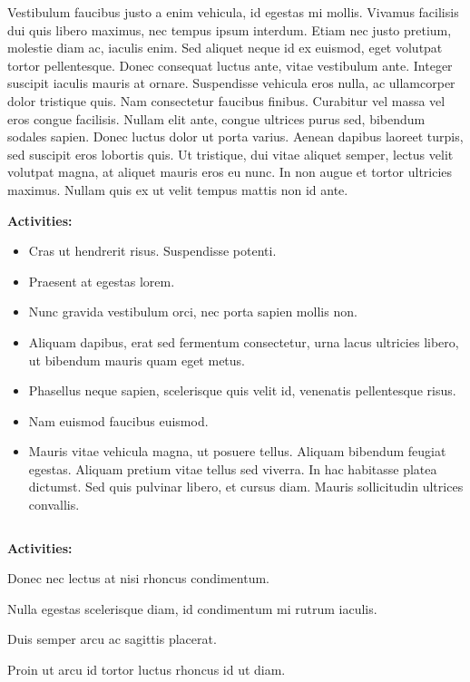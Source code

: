 \documentclass[
]{book}
\begin{document}
Vestibulum faucibus justo a enim vehicula, id egestas mi mollis. Vivamus facilisis dui quis libero maximus, nec tempus ipsum interdum. Etiam nec justo pretium, molestie diam ac, iaculis enim. Sed aliquet neque id ex euismod, eget volutpat tortor pellentesque. Donec consequat luctus ante, vitae vestibulum ante. Integer suscipit iaculis mauris at ornare. Suspendisse vehicula eros nulla, ac ullamcorper dolor tristique quis. Nam consectetur faucibus finibus. Curabitur vel massa vel eros congue facilisis. Nullam elit ante, congue ultrices purus sed, bibendum sodales sapien. Donec luctus dolor ut porta varius. Aenean dapibus laoreet turpis, sed suscipit eros lobortis quis. Ut tristique, dui vitae aliquet semper, lectus velit volutpat magna, at aliquet mauris eros eu nunc. In non augue et tortor ultricies maximus. Nullam quis ex ut velit tempus mattis non id ante.

\textbf{Activities:}

\begin{itemize}
\item
  Cras ut hendrerit risus. Suspendisse potenti.
\item
  Praesent at egestas lorem.
\item
  Nunc gravida vestibulum orci, nec porta sapien mollis non.
\item
  Aliquam dapibus, erat sed fermentum consectetur, urna lacus ultricies libero, ut bibendum mauris quam eget metus.
\item
  Phasellus neque sapien, scelerisque quis velit id, venenatis pellentesque risus.
\item
  Nam euismod faucibus euismod.
\item
  Mauris vitae vehicula magna, ut posuere tellus. Aliquam bibendum feugiat egestas. Aliquam pretium vitae tellus sed viverra. In hac habitasse platea dictumst. Sed quis pulvinar libero, et cursus diam. Mauris sollicitudin ultrices convallis.
\end{itemize}

\begin{longtable}[]{@{}l@{}}
\toprule()
\endhead
\bottomrule()
\end{longtable}

\textbf{Activities:}

Donec nec lectus at nisi rhoncus condimentum.

Nulla egestas scelerisque diam, id condimentum mi rutrum iaculis.

Duis semper arcu ac sagittis placerat.

Proin ut arcu id tortor luctus rhoncus id ut diam.
\end{document}
